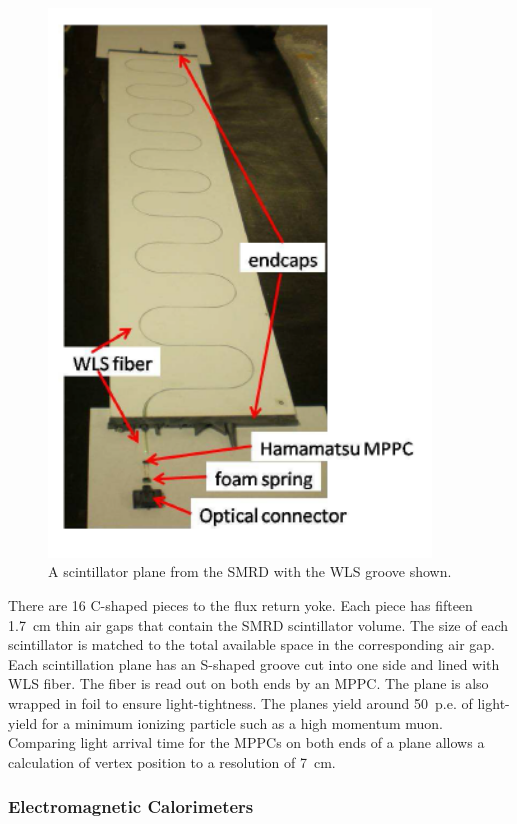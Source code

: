 \begin{figure}
\begin{center}
\includegraphics[width=4in]{./Figures/smrd1.png}
\end{center}
\caption{A scintillator plane from the SMRD with the WLS groove shown.}
\label{fig:smrd}
\end{figure}

There are 16 C-shaped pieces to the flux return yoke. Each piece has
fifteen 1.7~cm thin air gaps that contain the SMRD scintillator
volume. The size of each scintillator is matched to the total
available space in the corresponding air gap. Each scintillation plane
has an S-shaped groove cut into one side and lined with WLS fiber. The
fiber is read out on both ends by an MPPC. The plane is also wrapped
in foil to ensure light-tightness. The planes yield around 50~p.e. of
light-yield for a minimum ionizing particle such as a high momentum
muon. Comparing light arrival time for the MPPCs on both ends of a
plane allows a calculation of vertex position to a resolution of
7~cm. 

\subsubsection{Electromagnetic Calorimeters}

